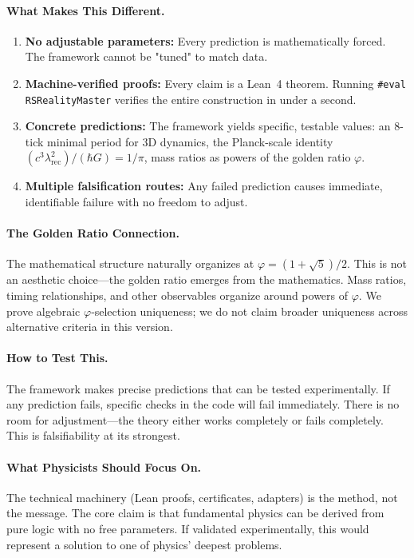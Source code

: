 \documentclass[11pt,a4paper,twoside]{article}
\numberwithin{equation}{section}
\theoremstyle{customthm}
\theoremstyle{customdef}
\theoremstyle{customrem}
\begin{document}
\paragraph{What Makes This Different.}
\begin{enumerate}[leftmargin=*,topsep=0pt,itemsep=2pt]
\item \textbf{No adjustable parameters:} Every prediction is mathematically forced. The framework cannot be "tuned" to match data.
\item \textbf{Machine-verified proofs:} Every claim is a Lean~4 theorem. Running \texttt{\#eval RSRealityMaster} verifies the entire construction in under a second.
\item \textbf{Concrete predictions:} The framework yields specific, testable values: an 8-tick minimal period for 3D dynamics, the Planck-scale identity $(c^3\lambda_{\mathrm{rec}}^2)/(\hbar G) = 1/\pi$, mass ratios as powers of the golden ratio $\varphi$.
\item \textbf{Multiple falsification routes:} Any failed prediction causes immediate, identifiable failure with no freedom to adjust.
\end{enumerate}

\paragraph{The Golden Ratio Connection.} The mathematical structure naturally organizes at $\varphi = (1+\sqrt{5})/2$. This is not an aesthetic choice—the golden ratio emerges from the mathematics. Mass ratios, timing relationships, and other observables organize around powers of $\varphi$. We prove algebraic $\varphi$‑selection uniqueness; we do not claim broader uniqueness across alternative criteria in this version.

\paragraph{How to Test This.} The framework makes precise predictions that can be tested experimentally. If any prediction fails, specific checks in the code will fail immediately. There is no room for adjustment—the theory either works completely or fails completely. This is falsifiability at its strongest.

\paragraph{What Physicists Should Focus On.} The technical machinery (Lean proofs, certificates, adapters) is the method, not the message. The core claim is that fundamental physics can be derived from pure logic with no free parameters. If validated experimentally, this would represent a solution to one of physics' deepest problems.
\end{document}
